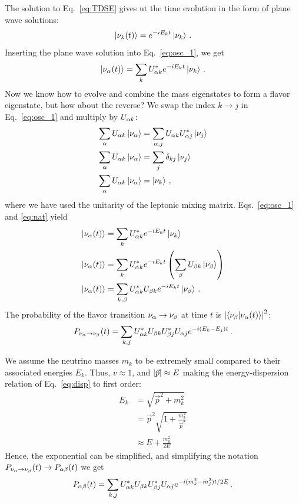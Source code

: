 \documentclass[draft=True]{revtex4-2}
\begin{document}
The solution to Eq.~\ref{eq:TDSE} gives ut the time evolution
in the form of plane wave solutions: 
\begin{align}
    \ket{\nu_k(t)} = e^{-iE_kt}\ket{\nu_k}\,.
\end{align}
Inserting the plane wave solution into Eq.~\ref{eq:osc_1}, we get 
\begin{align}\label{eq:nat}
    \ket{\nu_\alpha(t)} = \sum_k U^*_{\alpha k} e^{-iE_kt}\ket{\nu_k}\,.
\end{align}
Now we know how to evolve and combine the mass eigenstates to form a flavor eigenstate, but how about the reverse? We swap the index $k\to j$ in Eq.~\ref{eq:osc_1} and multiply by $U_{\alpha k}$:
\begin{align}\label{eq:osc_k}
    \sum_{\alpha} U_{\alpha k}\ket{\nu_\alpha} &= \sum_{\alpha, j} U_{\alpha k} U_{\alpha j}^* \ket{\nu_j} \nonumber \\
    \sum_{\alpha} U_{\alpha k}\ket{\nu_\alpha} &= \sum_{j} \delta_{kj} \ket{\nu_j} \nonumber \\
    \sum_{\alpha} U_{\alpha k}\ket{\nu_\alpha} &= \ket{\nu_k}\,,
\end{align}
where we have used the unitarity of the leptonic mixing matrix. Eqs.~\ref{eq:osc_1} and \ref{eq:nat} yield 
\begin{align}
    \ket{\nu_\alpha(t)} &= \sum_k U^*_{\alpha k} e^{-iE_kt}\ket{\nu_k} \nonumber \\
    \ket{\nu_\alpha(t)} &= \sum_k U^*_{\alpha k} e^{-iE_kt}\left(\sum_{\beta} U_{\beta k}\ket{\nu_\beta}\right) \nonumber \\
    \ket{\nu_\alpha(t)} &= \sum_{k,\beta} U^*_{\alpha k}U_{\beta k} e^{-iE_kt} \ket{\nu_\beta}\,.
\end{align}
The probability of the flavor transition $\nu_\alpha \to \nu_\beta$ at time $t$ is $\abs{\bra{\nu_\beta}\ket{\nu_\alpha (t)}}^2$:
\begin{align}
    P_{\nu_\alpha \to \nu_\beta}(t) = \sum_{k,j} U^*_{\alpha k}U_{\beta k}U^*_{\beta j}U_{\alpha j} e^{-i(E_k-E_j)t}\,.
\end{align}

We assume the neutrino masses $m_k$ to be extremely small compared to their associated energies $E_k$. Thus, $v\approx 1$, and $\abs{\vec{p}} \approx E$ making the energy-dispersion relation of Eq.~\ref{eq:disp} to first order:
\begin{align}\label{eq:ultra_rel}
    E_k &= \sqrt{\vec{p}^2 + m_k^2} \nonumber \\
        &= \vec{p}^2\sqrt{1 + \frac{m_k^2}{\vec{p}^2}} \nonumber \\
        &\approx E + \frac{m_k^2}{2E}
\end{align}
Hence, the exponential can be simplified, and simplifying the notation $P_{\nu_\alpha \to \nu_\beta}(t) \to P_{\alpha\beta}(t)$ we get 
\begin{align}
    P_{\alpha\beta}(t) = \sum_{k,j} U^*_{\alpha k}U_{\beta k}U^*_{\beta j}U_{\alpha j} e^{-i(m_k^2-m_j^2)t/2E}\,.
\end{align}
\end{document}

